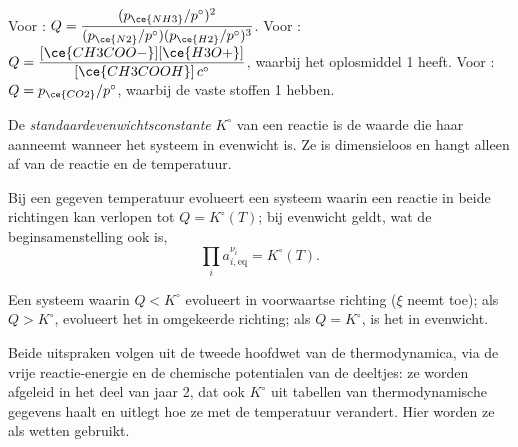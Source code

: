 \begin{example}\label{ex:b1:extent-q-and-k:quotients}
Voor : $Q = \dfrac{(p_{\ce{NH3}}/p^\circ)^2}
{(p_{\ce{N2}}/p^\circ)(p_{\ce{H2}}/p^\circ)^3}$. Voor
: $Q =
\dfrac{[\ce{CH3COO-}][\ce{H3O+}]}{[\ce{CH3COOH}]\,c^\circ}$, waarbij het
oplosmiddel  1 heeft. Voor :
$Q =
p_{\ce{CO2}}/p^\circ$, waarbij de vaste stoffen  1 hebben.
\end{example}

\begin{definition}[Standaardevenwichtsconstante]\label{def:b1:extent-q-and-k:equilibrium-constant}
De \emph{standaardevenwichtsconstante}
$K^\circ$ van een reactie is de waarde die haar  aanneemt
wanneer het systeem in evenwicht is. Ze is dimensieloos en hangt alleen
af van de reactie en de temperatuur.
\end{definition}

\begin{theorem}[Massawerkingswet]\label{thm:b1:extent-q-and-k:mass-action}
Bij een gegeven temperatuur evolueert een systeem waarin een reactie in
beide richtingen kan verlopen tot $Q = K^\circ(T)$; bij evenwicht geldt,
wat de beginsamenstelling ook is,
\[
  \prod_i a_{i,\text{eq}}^{\nu_i} = K^\circ(T) .
\]
\end{theorem}
\admitted

\begin{proposition}\label{prop:b1:extent-q-and-k:direction}
Een systeem waarin $Q < K^\circ$ evolueert in voorwaartse richting
($\xi$ neemt toe); als $Q > K^\circ$, evolueert het in omgekeerde
richting; als $Q = K^\circ$, is het in evenwicht.
\end{proposition}
\admitted

\begin{remark}\label{rem:b1:extent-q-and-k:origin}
Beide uitspraken volgen uit de tweede hoofdwet van de thermodynamica, via
de vrije reactie-energie en de chemische potentialen van de deeltjes: ze
worden afgeleid in het deel van jaar 2, dat ook $K^\circ$ uit tabellen
van thermodynamische gegevens haalt en uitlegt hoe ze met de temperatuur
verandert. Hier worden ze als wetten gebruikt.
\end{remark}

